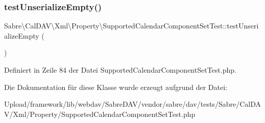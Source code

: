 \subsubsection{\texorpdfstring{test\+Unserialize\+Empty()}{testUnserializeEmpty()}}
{\footnotesize\ttfamily Sabre\textbackslash{}\+Cal\+D\+A\+V\textbackslash{}\+Xml\textbackslash{}\+Property\textbackslash{}\+Supported\+Calendar\+Component\+Set\+Test\+::test\+Unserialize\+Empty (\begin{DoxyParamCaption}{ }\end{DoxyParamCaption})}



Definiert in Zeile 84 der Datei Supported\+Calendar\+Component\+Set\+Test.\+php.



Die Dokumentation für diese Klasse wurde erzeugt aufgrund der Datei\+:\begin{DoxyCompactItemize}
\item 
Upload/framework/lib/webdav/\+Sabre\+D\+A\+V/vendor/sabre/dav/tests/\+Sabre/\+Cal\+D\+A\+V/\+Xml/\+Property/Supported\+Calendar\+Component\+Set\+Test.\+php\end{DoxyCompactItemize}
